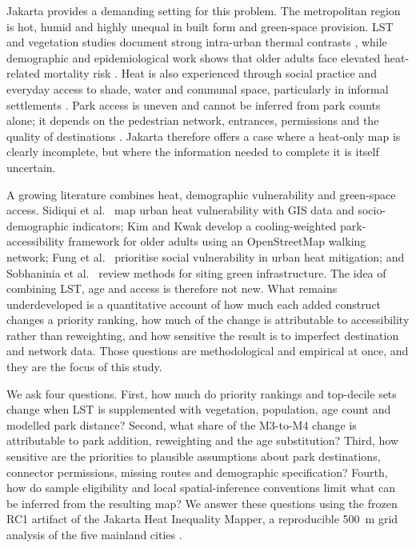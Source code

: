 \documentclass[times,twoside]{_Templates/MultiTargetManuscript}
\begin{document}
Jakarta provides a demanding setting for this problem. The metropolitan region
is hot, humid and highly unequal in built form and green-space provision. LST
and vegetation studies document strong intra-urban thermal contrasts
\citep{siswanto2023,putra2021,rizki2024}, while demographic and epidemiological
work shows that older adults face elevated heat-related mortality risk
\citep{varquez2020}. Heat is also experienced through social practice and
everyday access to shade, water and communal space, particularly in informal
settlements \citep{salsabila2023}. Park access is uneven and cannot be inferred
from park counts alone; it depends on the pedestrian network, entrances,
permissions and the quality of destinations \citep{wolch2014,rigolon2016,ekkel2017}.
Jakarta therefore offers a case where a heat-only map is clearly incomplete, but
where the information needed to complete it is itself uncertain.

A growing literature combines heat, demographic vulnerability and green-space
access. Sidiqui et al.\ \citep{sidiqui2022} map urban heat vulnerability with
GIS data and socio-demographic indicators; Kim and Kwak \citep{kim2026} develop a
cooling-weighted park-accessibility framework for older adults using an
OpenStreetMap walking network; Fung et al.\ \citep{fung2024} prioritise social
vulnerability in urban heat mitigation; and Sobhaninia et al.\
\citep{sobhaninia2025} review methods for siting green infrastructure. The idea
of combining LST, age and access is therefore not new. What remains
underdeveloped is a quantitative account of how much each added construct
changes a priority ranking, how much of the change is attributable to
accessibility rather than reweighting, and how sensitive the result is to
imperfect destination and network data. Those questions are methodological and
empirical at once, and they are the focus of this study.

We ask four questions. First, how much do priority rankings and top-decile sets
change when LST is supplemented with vegetation, population, age count and
modelled park distance? Second, what share of the M3-to-M4 change is attributable
to park addition, reweighting and the age substitution? Third, how sensitive are
the priorities to plausible assumptions about park destinations, connector
permissions, missing routes and demographic specification? Fourth, how do sample
eligibility and local spatial-inference conventions limit what can be inferred
from the resulting map? We answer these questions using the frozen RC1 artifact
of the Jakarta Heat Inequality Mapper, a reproducible 500~m grid analysis of the
five mainland cities \citep{jhim2026}.
\end{document}
